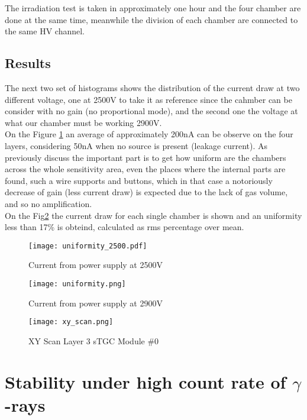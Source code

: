 The irradiation test is taken in approximately one hour and the four chamber are done at the same time, meanwhile the
division of each chamber are connected to the same HV channel. 




\subsection{Results}
The next two set of histograms shows the distribution of the current draw at two different voltage, one at 2500V to take
it as  reference since the cahmber can be consider with no gain (no proportional mode), and the second one the voltage
at what our chamber must be working 2900V.\\ On the Figure \ref{fig:2500V} an average of approximately \unit{200}{nA}
can be observe on the four layers, considering \unit{50}{nA} when no source is present (leakage current).  As previously
discuss the important part is to get how uniform are the chambers across the whole sensitivity area, even the places
where the internal parts are found, such a wire supports and buttons, which in that case a notoriously decrease of gain
(less current draw) is expected due to the lack of gas volume, and so no amplification.\\

On the Fig\ref{fig:2900V} the current draw for each single chamber is shown and an  uniformity less than 17\% is
obteind, calculated as rms percentage over  mean. 
\begin{figure}[t]
	\centering
	\texttt{[image: uniformity\_2500.pdf]}
	\caption{Current from power supply at 2500V}\label{fig:2500V}
\end{figure}

\begin{figure}[hb]
	\centering
	\texttt{[image: uniformity.png]}
	\caption{Current from power supply at 2900V}\label{fig:2900V}
\end{figure}
\begin{figure}[hb]
	\centering
	\texttt{[image: xy\_scan.png]}
	\caption{XY Scan Layer 3 sTGC Module \#0}\label{fig:xy_scan}
\end{figure}


\section{Stability under high count rate of $\gamma$-rays}

